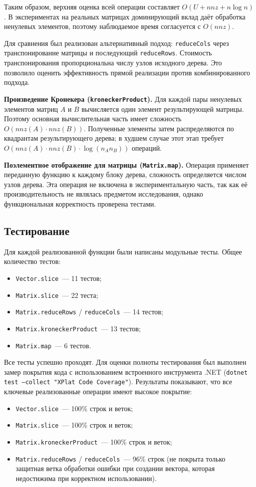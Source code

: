 \documentclass[a4paper]{article}
\begin{document}
Таким образом, верхняя оценка всей операции составляет \(O(U + nnz + n\log n)\). В экспериментах на реальных матрицах доминирующий вклад даёт обработка ненулевых элементов, поэтому наблюдаемое время согласуется с \(O(nnz)\).

Для сравнения был реализован альтернативный подход: \texttt{reduceCols} через транспонирование матрицы и последующий \texttt{reduceRows}. Стоимость транспонирования пропорциональна числу узлов исходного дерева. Это позволило оценить эффективность прямой реализации против комбинированного подхода.

\textbf{Произведение Кронекера (\texttt{kroneckerProduct}).} Для каждой пары ненулевых элементов матриц \(A\) и \(B\) вычисляется один элемент результирующей матрицы. Поэтому основная вычислительная часть имеет сложность \(O(nnz(A)\cdot nnz(B))\). Полученные элементы затем распределяются по квадрантам результирующего дерева; в худшем случае этот этап требует \(O(nnz(A)\cdot nnz(B)\cdot \log(n_A n_B))\) операций. 

\textbf{Поэлементное отображение для матрицы (\texttt{Matrix.map}).} Операция применяет переданную функцию к каждому блоку дерева, сложность определяется числом узлов дерева. Эта операция не включена в экспериментальную часть, так как её производительность не являлась предметом исследования, однако функциональная корректность проверена тестами.

\subsection{Тестирование}

Для каждой реализованной функции были написаны модульные тесты. Общее количество тестов:
\begin{itemize}
    \item \texttt{Vector.slice}~--- 11 тестов;
    \item \texttt{Matrix.slice}~--- 22 теста;
    \item \texttt{Matrix.reduceRows} / \texttt{reduceCols}~--- 14 тестов;
    \item \texttt{Matrix.kroneckerProduct}~--- 13 тестов;
    \item \texttt{Matrix.map}~--- 6 тестов.
\end{itemize}

Все тесты успешно проходят. Для оценки полноты тестирования был выполнен замер покрытия кода с использованием встроенного инструмента .NET (\texttt{dotnet test --collect "XPlat Code Coverage"}). Результаты показывают, что все ключевые реализованные операции имеют высокое покрытие:
\begin{itemize}
    \item \texttt{Vector.slice}~--- 100\% строк и веток;
    \item \texttt{Matrix.slice}~--- 100\% строк и веток;
    \item \texttt{Matrix.kroneckerProduct}~--- 100\% строк и веток;
    \item \texttt{Matrix.reduceRows} / \texttt{reduceCols}~--- 96\% строк (не покрыта только защитная ветка обработки ошибки при создании вектора, которая недостижима при корректном использовании).
\end{itemize}
\end{document}

